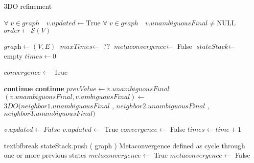 \documentclass{article}
\begin{document}
\begin{algorithm}
\caption{3DO refinement}\label{euclid}
\begin{algorithmic}[1]
\Require $\forall \; v \in graph \quad v.updated \gets \text{True} $
\Require $\forall \; v \in graph \quad v.unambiguousFinal \neq \text{NULL}$
\State $\textit{order} \gets \mathcal{S}(V)$

\State $\textit{graph}           \gets (V,E)$
\State $\textit{maxTimes}        \gets$ ??
\State $\textit{metaconvergence} \gets$ False
\State $\textit{stateStack}      \gets$ empty
\State $\textit{times}           \gets 0$

\Repeat
    \State $convergence \gets$ True

            \State \textbf{continue}
            \State \textbf{continue}
        \Else 
            \State $prevValue \gets v.unambiguousFinal$ 
            \State {}
            \State $(v.unambiguousFinal, v.ambiguousFinal) \gets$ 
            \State \quad \quad \quad \quad $3DO ( neighbor1.unambiguousFinal$
            \State \quad \quad \quad \quad \quad \quad , $neighbor2.unambiguousFinal$ 
            \State \quad \quad \quad \quad \quad \quad , $neighbor3.unambiguousFinal )$ 

                \State $v.updated \gets False$
            \Else 
                \State $v.updated \gets$ \; True
                \State $convergence \gets$ \; False
            \EndIf
        \EndIf
        \State $times \gets time + 1$
    \EndFor

        \State textbf{break}
    \Else
        \State stateStack.push ( graph )
            \Comment Metaconvergence defined as cycle through one or more previous states
                \State $metaconvergence \gets$ \; True
            \Else
                \State $metaconvergence \gets$ \; False
            \EndIf
    \EndIf


\end{algorithmic}
\end{algorithm}
\end{document}
